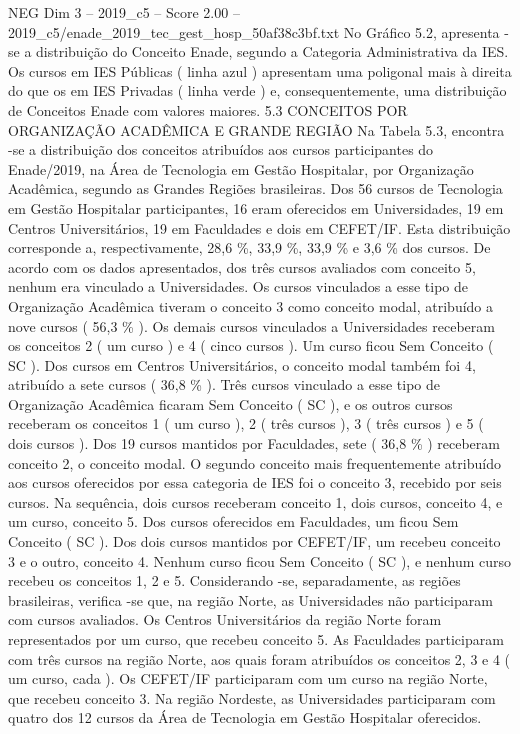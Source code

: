 \begin{textsample}{NEG Dim 3 – 2019\_c5 – Score 2.00 – 2019\_c5/enade\_2019\_tec\_gest\_hosp\_50af38c3bf.txt}
No Gráfico 5.2, apresenta -se a distribuição do Conceito Enade, segundo a Categoria Administrativa da IES.
Os cursos em IES Públicas ( linha azul ) apresentam uma poligonal mais à direita do que os em IES Privadas ( linha verde ) e, consequentemente, uma distribuição de Conceitos Enade com valores maiores. 5.3 CONCEITOS POR ORGANIZAÇÃO ACADÊMICA E GRANDE REGIÃO Na Tabela 5.3, encontra -se a distribuição dos conceitos atribuídos aos cursos participantes do Enade/2019, na Área de Tecnologia em Gestão Hospitalar, por Organização Acadêmica, segundo as Grandes Regiões brasileiras.
Dos 56 cursos de Tecnologia em Gestão Hospitalar participantes, 16 eram oferecidos em Universidades, 19 em Centros Universitários, 19 em Faculdades e dois em CEFET/IF.
Esta distribuição corresponde a, respectivamente, 28,6 \%, 33,9 \%, 33,9 \% e 3,6 \% dos cursos.
De acordo com os dados apresentados, dos três cursos avaliados com conceito 5, nenhum era vinculado a Universidades.
Os cursos vinculados a esse tipo de Organização Acadêmica tiveram o conceito 3 como conceito modal, atribuído a nove cursos ( 56,3 \% ).
Os demais cursos vinculados a Universidades receberam os conceitos 2 ( um curso ) e 4 ( cinco cursos ).
Um curso ficou Sem Conceito ( SC ).
Dos cursos em Centros Universitários, o conceito modal também foi 4, atribuído a sete cursos ( 36,8 \% ).
Três cursos vinculado a esse tipo de Organização Acadêmica ficaram Sem Conceito ( SC ), e os outros cursos receberam os conceitos 1 ( um curso ), 2 ( três cursos ), 3 ( três cursos ) e 5 ( dois cursos ).
Dos 19 cursos mantidos por Faculdades, sete ( 36,8 \% ) receberam conceito 2, o conceito modal.
O segundo conceito mais frequentemente atribuído aos cursos oferecidos por essa categoria de IES foi o conceito 3, recebido por seis cursos.
Na sequência, dois cursos receberam conceito 1, dois cursos, conceito 4, e um curso, conceito 5.
Dos cursos oferecidos em Faculdades, um ficou Sem Conceito ( SC ).
Dos dois cursos mantidos por CEFET/IF, um recebeu conceito 3 e o outro, conceito 4.
Nenhum curso ficou Sem Conceito ( SC ), e nenhum curso recebeu os conceitos 1, 2 e 5.
Considerando -se, separadamente, as regiões brasileiras, verifica -se que, na região Norte, as Universidades não participaram com cursos avaliados.
Os Centros Universitários da região Norte foram representados por um curso, que recebeu conceito 5.
As Faculdades participaram com três cursos na região Norte, aos quais foram atribuídos os conceitos 2, 3 e 4 ( um curso, cada ).
Os CEFET/IF participaram com um curso na região Norte, que recebeu conceito 3.
Na região Nordeste, as Universidades participaram com quatro dos 12 cursos da Área de Tecnologia em Gestão Hospitalar oferecidos.

\end{textsample}
